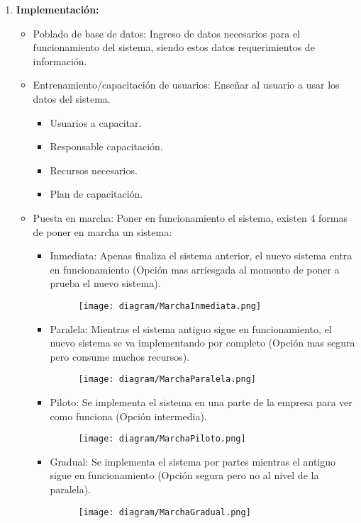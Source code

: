 \documentclass{templateNote}
\begin{document}
\begin{enumerate}
    \newpage
    \item \label{item:ImplCas} \textbf{Implementación:} 
    \begin{itemize}
        \item Poblado de base de datos: Ingreso de datos necesarios para el funcionamiento del sistema, siendo estos datos requerimientos de información.
        \item Entrenamiento/capacitación de usuarios: Enseñar al usuario a usar los datos del sistema.
        \begin{itemize}
            \item Usuarios a capacitar.
            \item Responsable capacitación.
            \item Recursos necesarios.
            \item Plan de capacitación. 
        \end{itemize}
        \item Puesta en marcha: Poner en funcionamiento el sistema, existen 4 formas de poner en marcha un sistema:            
        \begin{itemize}
            \item Inmediata: Apenas finaliza el sistema anterior, el nuevo sistema entra en funcionamiento (Opción mas arriesgada al momento de poner a prueba el nuevo sistema).
            \begin{figure}[H]
                \centering
                \texttt{[image: diagram/MarchaInmediata.png]}
            \end{figure}
            \item Paralela: Mientras el sistema antiguo sigue en funcionamiento, el nuevo sistema se va implementando por completo (Opción mas segura pero consume muchos recursos).
            \begin{figure}[H]
                \centering
                \texttt{[image: diagram/MarchaParalela.png]}
            \end{figure}
            \item Piloto: Se implementa el sistema en una parte de la empresa para ver como funciona (Opción intermedia).
            \begin{figure}[H]
                \centering
                \texttt{[image: diagram/MarchaPiloto.png]}
            \end{figure}
            \item Gradual: Se implementa el sistema por partes mientras el antiguo sigue en funcionamiento (Opción segura pero no al nivel de la paralela).
            \begin{figure}[H]
                \centering
                \texttt{[image: diagram/MarchaGradual.png]}
            \end{figure}
        \end{itemize}
    \end{itemize}


\end{enumerate}
\end{document}
